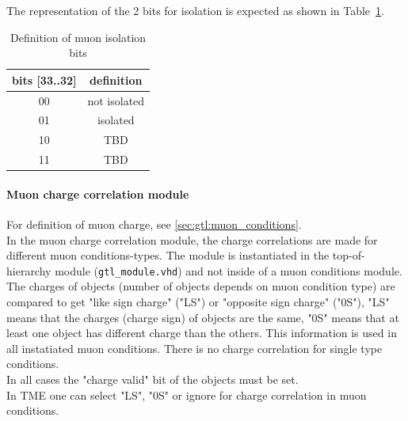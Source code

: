 The representation of the 2 bits for isolation is expected as shown in Table~\ref{tab:gtl:muon_iso_bits}.\\
 
\begin{table}[ht]
\caption{Definition of muon isolation bits}
\vspace{5mm}
\centering
\begin{tabular}{|c|c|}\hline
bits [33..32] & definition \\\hline\hline
00 & not isolated \\
01 & isolated \\
10 & TBD \\
11 & TBD \\\hline
\end{tabular}
\label{tab:gtl:muon_iso_bits}
\end{table}

\clearpage

\paragraph{Muon charge correlation module}\label{sec:gtl:muon_charge_correlation_module}

For definition of muon charge, see \ref{sec:gtl:muon_conditions}.\\
In the muon charge correlation module, the charge correlations are made for different muon conditions-types. The module is instantiated in the top-of-hierarchy module (\texttt{gtl\_module.vhd})
and not inside of a muon conditions module. 
The charges of objects (number of objects depends on muon condition type) are compared to get "like sign charge" ("LS") or "opposite sign charge" ("0S"), "LS" means that the charges (charge sign)
of objects are the same, "0S" means that at least one object has different charge than the others. This information is used in all instatiated muon conditions.
There is no charge correlation for single type conditions.\\
In all cases the "charge valid" bit of the objects must be set.\\
In TME one can select "LS", "0S" or ignore for charge correlation in muon conditions.\\

% 
% 
% 
% 
% 
% 


